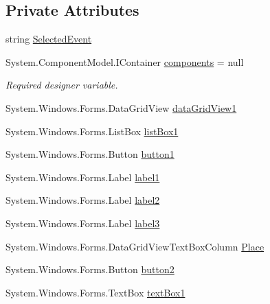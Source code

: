 \subsection*{Private Attributes}
\begin{DoxyCompactItemize}
\item 
string \hyperlink{classProject__Codename__Olympia__v1_1_1__0_1_1ScoringForm_a93760c23c8a04122d96f9ba29adc7f79}{Selected\+Event}
\item 
System.\+Component\+Model.\+I\+Container \hyperlink{classProject__Codename__Olympia__v1_1_1__0_1_1ScoringForm_a7a32c6e8e5131ea279dcfedc3166ffe4}{components} = null
\begin{DoxyCompactList}\small\item\em Required designer variable. \end{DoxyCompactList}\item 
System.\+Windows.\+Forms.\+Data\+Grid\+View \hyperlink{classProject__Codename__Olympia__v1_1_1__0_1_1ScoringForm_aa421e7b28ebbb430c6892a711b6f823b}{data\+Grid\+View1}
\item 
System.\+Windows.\+Forms.\+List\+Box \hyperlink{classProject__Codename__Olympia__v1_1_1__0_1_1ScoringForm_a72901fc5feff3003cdc038cfbf1d4bcc}{list\+Box1}
\item 
System.\+Windows.\+Forms.\+Button \hyperlink{classProject__Codename__Olympia__v1_1_1__0_1_1ScoringForm_ae9299ebbd6c5a116dfcb48b4838c2ba0}{button1}
\item 
System.\+Windows.\+Forms.\+Label \hyperlink{classProject__Codename__Olympia__v1_1_1__0_1_1ScoringForm_a102bf1793a3f3883100538f7ed8e9493}{label1}
\item 
System.\+Windows.\+Forms.\+Label \hyperlink{classProject__Codename__Olympia__v1_1_1__0_1_1ScoringForm_a5a9769bf47df100077650afed0afc1b3}{label2}
\item 
System.\+Windows.\+Forms.\+Label \hyperlink{classProject__Codename__Olympia__v1_1_1__0_1_1ScoringForm_a5862e2dce286250a07381afed0012f00}{label3}
\item 
System.\+Windows.\+Forms.\+Data\+Grid\+View\+Text\+Box\+Column \hyperlink{classProject__Codename__Olympia__v1_1_1__0_1_1ScoringForm_a908034221bf7665e924c4c393f868a84}{Place}
\item 
System.\+Windows.\+Forms.\+Button \hyperlink{classProject__Codename__Olympia__v1_1_1__0_1_1ScoringForm_a90bcb7c0e517fe0bbeacd47bc6351eaf}{button2}
\item 
System.\+Windows.\+Forms.\+Text\+Box \hyperlink{classProject__Codename__Olympia__v1_1_1__0_1_1ScoringForm_ab842136ba522120328485d1a0b7acff3}{text\+Box1}

\end{DoxyCompactItemize}
